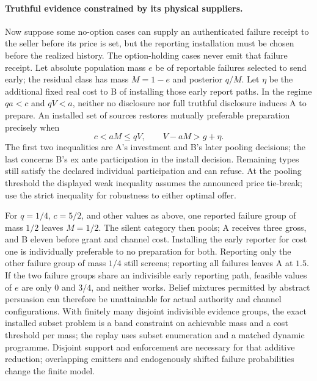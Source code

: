 \documentclass{article}
\begin{document}
\paragraph{Truthful evidence constrained by its physical suppliers.}
Now suppose some no-option cases can supply an authenticated failure receipt to the seller before its price is set, but the reporting installation must be chosen before the realized history. The option-holding cases never emit that failure receipt. Let absolute population mass $e$ be of reportable failures selected to send early; the residual class has mass $M=1-e$ and posterior $q/M$. Let $\eta$ be the additional fixed real cost to B of installing those early report paths. In the regime $qa<c$ and $qV<a$, neither no disclosure nor full truthful disclosure induces A to prepare. An installed set of sources restores mutually preferable preparation precisely when
\[
  c<aM\le qV,\qquad V-aM>g+\eta.
\]
The first two inequalities are A's investment and B's later pooling decisions; the last concerns B's ex ante participation in the install decision. Remaining types still satisfy the declared individual participation and can refuse. At the pooling threshold the displayed weak inequality assumes the announced price tie-break; use the strict inequality for robustness to either optimal offer.

For $q=1/4$, $c=5/2$, and other values as above, one reported failure group of mass $1/2$ leaves $M=1/2$. The silent category then pools; A receives three gross, and B eleven before grant and channel cost. Installing the early reporter for cost one is individually preferable to no preparation for both. Reporting only the other failure group of mass $1/4$ still screens; reporting all failures leaves A at $1.5$. If the two failure groups share an indivisible early reporting path, feasible values of $e$ are only $0$ and $3/4$, and neither works. Belief mixtures permitted by abstract persuasion can therefore be unattainable for actual authority and channel configurations. With finitely many disjoint indivisible evidence groups, the exact installed subset problem is a band constraint on achievable mass and a cost threshold per mass; the replay uses subset enumeration and a matched dynamic programme. Disjoint support and enforcement are necessary for that additive reduction; overlapping emitters and endogenously shifted failure probabilities change the finite model.
\end{document}
